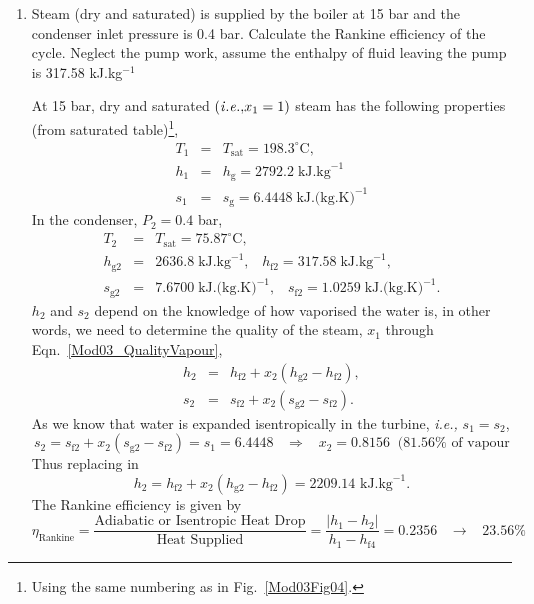 \documentclass[12pts,a4paper,amsmath,amssymb,floatfix]{article}%
\newcommand{\frc}{\displaystyle\frac}
\newcommand{\ie}{{\it i.e., }}
\begin{document}
\begin{enumerate}[1)]
\item\label{Mod03Ex06} Steam (dry and saturated) is supplied by the boiler at 15 bar and the condenser inlet pressure is 0.4 bar. Calculate the Rankine efficiency of the cycle. Neglect the pump work, assume the enthalpy of fluid leaving the pump is 317.58 kJ.kg$^{-1}$

     At 15 bar, dry and saturated $\left(\ie x_{1}=1\right)$ steam has the following properties (from saturated table)\footnote{Using the same numbering as in Fig.~\ref{Mod03Fig04}.},
          \begin{eqnarray}
             T_{1} &=& T_{\text{sat}} = 198.3^{\circ}\text{C},\nonumber \\
             h_{1} &=& h_{\text{g}} = 2792.2\; \text{kJ.kg}^{-1} \nonumber \\
             s_{1} &=& s_{\text{g}} = 6.4448\; \text{kJ.(kg.K)}^{-1} \nonumber
          \end{eqnarray} 
    In the condenser, $P_{2}=0.4$ bar,
          \begin{eqnarray}
              T_{2} &=& T_{\text{sat}} = 75.87^{\circ}\text{C}, \nonumber \\
              h_{\text{g}2} &=& 2636.8\;\text{kJ.kg}^{-1},\;\;\; h_{\text{f}2} = 317.58\;\text{kJ.kg}^{-1},  \nonumber \\
              s_{\text{g}2} &=& 7.6700 \;\text{kJ.(kg.K)}^{-1},\;\;\; s_{\text{f}2} = 1.0259\;\text{kJ.(kg.K)}^{-1}. \nonumber  
          \end{eqnarray}
$h_{2}$ and $s_{2}$ depend on the knowledge of how vaporised the water is, in other words, we need to determine the quality of the steam, $x_{1}$ through Eqn.~\ref{Mod03_QualityVapour},
      \begin{eqnarray}
          h_{2} &=& h_{\text{f}2} + x_{2}\left(h_{\text{g}2} - h_{\text{f}2}\right), \nonumber \\
          s_{2} &=& s_{\text{f}2} + x_{2}\left(s_{\text{g}2} - s_{\text{f}2}\right). \nonumber
      \end{eqnarray}
As we know that water is expanded isentropically in the turbine, \ie $s_{1}=s_{2}$,
      \begin{displaymath}
         s_{2} = s_{\text{f}2} + x_{2}\left(s_{\text{g}2} - s_{\text{f}2}\right) = s_{1} = 6.4448 \;\;\;\Rightarrow \;\;\; x_{2} = 0.8156 \;\;(81.56\% \text{ of vapour}
      \end{displaymath}
Thus replacing in 
      \begin{displaymath}
          h_{2} = h_{\text{f}2} + x_{2}\left(h_{\text{g}2} - h_{\text{f}2}\right) = 2209.14\text{ kJ.kg}^{-1}.
      \end{displaymath}
The Rankine efficiency is given by
      \begin{displaymath}
           \eta_{\text{Rankine}} = \frc{\text{Adiabatic or Isentropic Heat Drop}}{\text{Heat Supplied}} = \frc{\left|h_{1}-h_{2}\right|}{h_{1}-h_{\text{f}4}} = 0.2356\;\;\;\rightarrow \;\;\; 23.56\%
      \end{displaymath}
    


\end{enumerate}
\end{document}
